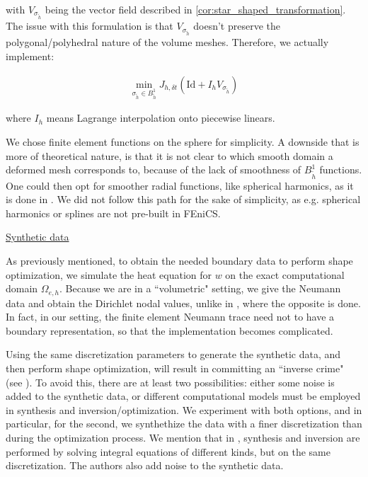 \documentclass[english,a4paper,10pt,oneside]{scrbook}	%
\theoremstyle{break}
\theoremstyle{remark}
\newcommand{\id}{\text{Id}}
\begin{document}
with $V_{\sigma_{\tilde{h}}}$ being the vector field described in  \cref{cor:star_shaped_transformation}. The issue with this formulation is that  $V_{\sigma_{\tilde{h}}}$ doesn't preserve the polygonal/polyhedral nature of the volume meshes. Therefore, we actually implement:

\begin{align*}
	\min_{\sigma_{\tilde{h}} \in B^1_{\tilde{h}}}J_{h,\delta t }(\id  + I_h V_{\sigma_{\tilde{h}}})
\end{align*}

where $I_h$ means Lagrange interpolation onto piecewise linears.

We chose finite element functions on the sphere for simplicity. A downside that is more of theoretical nature, is that it is not clear to which smooth domain a deformed mesh corresponds to, because of the lack of smoothness of $B^1_{\tilde{h}}$ functions. One could then opt for smoother radial functions, like spherical harmonics, as it is done in \cite{harbrecht}. We did not follow this path for the sake of simplicity, as e.g. spherical harmonics or splines are not pre-built in FEniCS.


\underline{Synthetic data}

As previously mentioned, to obtain the needed boundary data to perform shape optimization, we simulate the heat equation for $w$ on the exact computational domain $\Omega_{e,h}$. Because we are in a ``volumetric" setting, we give the Neumann data and obtain the Dirichlet nodal values, unlike in \cite{harbrecht}, where the opposite is done. In fact, in our setting, the finite element Neumann trace need not to have a boundary representation, so that the implementation becomes complicated.

Using the same discretization parameters to generate the synthetic data, and then perform shape optimization, will result in committing an ``inverse crime" (see \cite{wirgin}). To avoid this, there are at least two possibilities: either some noise is added to the synthetic data, or different computational models must be employed in synthesis and inversion/optimization. We experiment with both options, and in particular, for the second, we synthethize the data with a finer discretization than during the optimization process. We mention that in \cite{harbrecht}, synthesis and inversion are performed by solving integral equations of different kinds, but on the same discretization. The authors also add noise to the synthetic data.  
\end{document}
